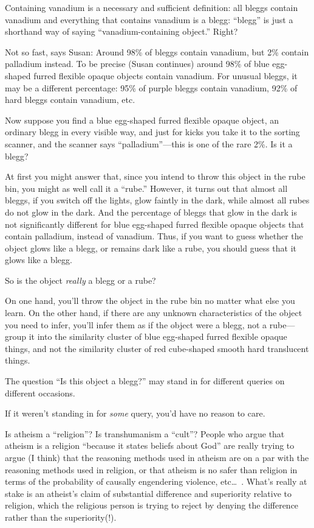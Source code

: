{
 Containing vanadium is a necessary and sufficient definition: all
bleggs contain vanadium and everything that contains vanadium is a
blegg: ``blegg'' is just a shorthand
way of saying ``vanadium-containing
object.'' Right?}

{
 Not so fast, says Susan: Around 98\% of bleggs contain vanadium,
but 2\% contain palladium instead. To be precise (Susan continues)
around 98\% of blue egg-shaped furred flexible opaque objects contain
vanadium. For unusual bleggs, it may be a different percentage: 95\% of
purple bleggs contain vanadium, 92\% of hard bleggs contain vanadium,
etc.}

{
 Now suppose you find a blue egg-shaped furred flexible opaque
object, an ordinary blegg in every visible way, and just for kicks you
take it to the sorting scanner, and the scanner says
``palladium''---this is one of the
rare 2\%. Is it a blegg?}

{
 At first you might answer that, since you intend to throw this
object in the rube bin, you might as well call it a
``rube.'' However, it turns out that
almost all bleggs, if you switch off the lights, glow faintly in the
dark, while almost all rubes do not glow in the dark. And the
percentage of bleggs that glow in the dark is not significantly
different for blue egg-shaped furred flexible opaque objects that
contain palladium, instead of vanadium. Thus, if you want to guess
whether the object glows like a blegg, or remains dark like a rube, you
should guess that it glows like a blegg.}

{
 So is the object \textit{really} a blegg or a rube?}

{
 On one hand, you'll throw the object in the rube
bin no matter what else you learn. On the other hand, if there are any
unknown characteristics of the object you need to infer,
you'll infer them as if the object were a blegg, not a
rube---group it into the similarity cluster of blue egg-shaped furred
flexible opaque things, and not the similarity cluster of red
cube-shaped smooth hard translucent things.}

{
 The question ``Is this object a
blegg?'' may stand in for different queries on
different occasions.}

{
 If it weren't standing in for \textit{some} query,
you'd have no reason to care.}

{
 Is atheism a ``religion''? Is
transhumanism a ``cult''? People who
argue that atheism is a religion ``because it states
beliefs about God'' are really trying to argue (I
think) that the reasoning methods used in atheism are on a par with the
reasoning methods used in religion, or that atheism is no safer than
religion in terms of the probability of causally engendering violence,
etc\ldots~. What's really at stake is an
atheist's claim of substantial difference and
superiority relative to religion, which the religious person is trying
to reject by denying the difference rather than the superiority(!).}

